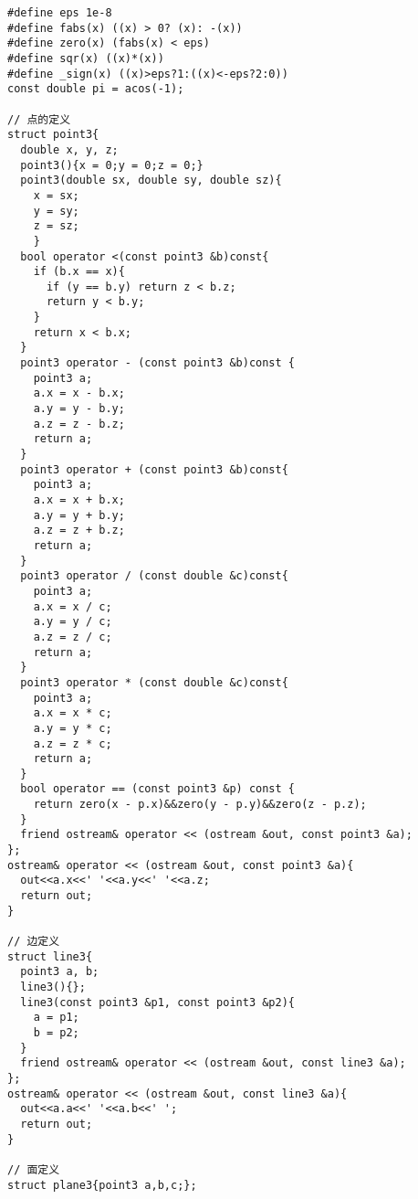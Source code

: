 \begin{lstlisting}[language={}]
#define eps 1e-8
#define fabs(x) ((x) > 0? (x): -(x))
#define zero(x) (fabs(x) < eps)
#define sqr(x) ((x)*(x))
#define _sign(x) ((x)>eps?1:((x)<-eps?2:0))
const double pi = acos(-1);

// 点的定义 
struct point3{
  double x, y, z;
  point3(){x = 0;y = 0;z = 0;}
  point3(double sx, double sy, double sz){
    x = sx;
    y = sy;
    z = sz;
    }
  bool operator <(const point3 &b)const{
    if (b.x == x){
      if (y == b.y) return z < b.z;
      return y < b.y;
    }
    return x < b.x;
  }
  point3 operator - (const point3 &b)const {
    point3 a;
    a.x = x - b.x;
    a.y = y - b.y;
    a.z = z - b.z;
    return a;
  }
  point3 operator + (const point3 &b)const{
    point3 a;
    a.x = x + b.x;
    a.y = y + b.y;
    a.z = z + b.z;
    return a;
  }
  point3 operator / (const double &c)const{
    point3 a;
    a.x = x / c;
    a.y = y / c;
    a.z = z / c;
    return a;
  }
  point3 operator * (const double &c)const{
    point3 a;
    a.x = x * c;
    a.y = y * c; 
    a.z = z * c;
    return a;
  }
  bool operator == (const point3 &p) const {
    return zero(x - p.x)&&zero(y - p.y)&&zero(z - p.z);
  }
  friend ostream& operator << (ostream &out, const point3 &a);
};
ostream& operator << (ostream &out, const point3 &a){
  out<<a.x<<' '<<a.y<<' '<<a.z;
  return out;
}

// 边定义
struct line3{
  point3 a, b;
  line3(){};
  line3(const point3 &p1, const point3 &p2){
    a = p1;
    b = p2;
  }
  friend ostream& operator << (ostream &out, const line3 &a);
};
ostream& operator << (ostream &out, const line3 &a){
  out<<a.a<<' '<<a.b<<' ';
  return out;
}

// 面定义
struct plane3{point3 a,b,c;};
\end{lstlisting}
